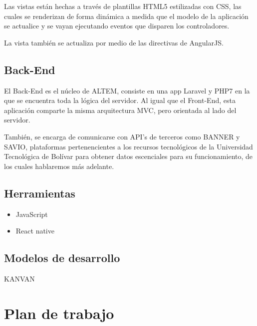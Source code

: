 Las vistas están hechas a través de plantillas HTML5 estilizadas con CSS, las cuales se renderizan de forma dinámica a medida que el modelo de la aplicación se actualice y se vayan ejecutando eventos que disparen los controladores.

La vista también se actualiza por medio de las directivas de AngularJS.

\subsection{Back-End}
El Back-End es el núcleo de ALTEM, consiste en una app Laravel y PHP7 en la que se encuentra toda la lógica del servidor.
Al igual que el Front-End, esta aplicación comparte la misma arquitectura MVC, pero orientada al lado del servidor. 

También, se encarga de comunicarse con API's de terceros como BANNER y SAVIO, plataformas pertenencientes a los recursos tecnológicos de la Universidad Tecnológica de Bolívar para obtener datos escenciales para su funcionamiento, de los cuales hablaremos más adelante. 




\subsection{Herramientas}
    \begin{itemize}
         \item JavaScript
         \item React native
    \end{itemize}
 \subsection{Modelos de desarrollo}
     KANVAN

\section{Plan de trabajo}

